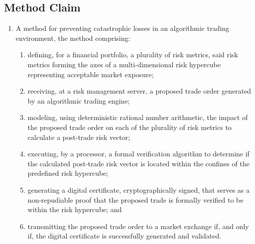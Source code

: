\documentclass{article}
\begin{document}
\subsection*{Method Claim}
\begin{enumerate}
    \item A method for preventing catastrophic losses in an algorithmic trading environment, the method comprising:
    \begin{enumerate}
        \item defining, for a financial portfolio, a plurality of risk metrics, said risk metrics forming the axes of a multi-dimensional risk hypercube representing acceptable market exposure;
        \item receiving, at a risk management server, a proposed trade order generated by an algorithmic trading engine;
        \item modeling, using deterministic rational number arithmetic, the impact of the proposed trade order on each of the plurality of risk metrics to calculate a post-trade risk vector;
        \item executing, by a processor, a formal verification algorithm to determine if the calculated post-trade risk vector is located within the confines of the predefined risk hypercube;
        \item generating a digital certificate, cryptographically signed, that serves as a non-repudiable proof that the proposed trade is formally verified to be within the risk hypercube; and
        \item transmitting the proposed trade order to a market exchange if, and only if, the digital certificate is successfully generated and validated.
    \end{enumerate}
\end{enumerate}
\end{document}
